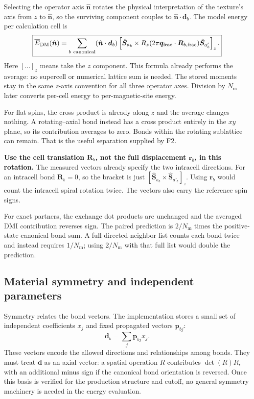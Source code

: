 \documentclass[11pt,a4paper]{article}
\numberwithin{equation}{section}
\newcommand{\vct}[1]{\bm{#1}}
\newcommand{\nh}{\hat{\vct n}}
\newcommand{\qh}{\vct q}
\newcommand{\Nm}{N_{\mathrm m}}
\begin{document}
Selecting the operator axis $\nh$ rotates the physical interpretation
of the texture's axis from $z$ to $\nh$, so the surviving component
couples to $\nh\cdot\vct d_b$. The model energy per calculation cell is
\begin{equation}\label{eq:ham}
 \boxed{\overline E_{\rm DM}(\nh)=
 \sum_{b\ {\rm canonical}}
 (\nh\cdot\vct d_b)
 \left[\hat{\vct S}_{a_b}\times
 R_z(2\pi\qh_{\rm frac}\cdot\vct R_{b,\rm frac})
 \hat{\vct S}_{a'_b}\right]_z.}
\end{equation}
Here $[\ldots]_z$ means take the $z$ component. This formula already
performs the average: no supercell or numerical lattice sum is needed.
The stored moments stay in the same $z$-axis convention for all three
operator axes. Division by $\Nm$ later converts per-cell energy to
per-magnetic-site energy.

For flat spins, the cross product is already along $z$ and the average
changes nothing. A rotating--axial bond instead has a cross product
entirely in the $xy$ plane, so its contribution averages to zero.
Bonds within the rotating sublattice can remain. That is the useful
separation supplied by F2.

\textbf{Use the cell translation $\vct R_b$, not the full displacement
$\vct r_b$, in this rotation.}
The measured vectors already specify the two intracell directions.
For an intracell bond $\vct R_b=0$, so the bracket is just
$[\hat{\vct S}_{a_b}\times\hat{\vct S}_{a'_b}]_z$.
Using $\vct r_b$ would count the intracell spiral rotation twice.
The vectors also carry the reference spin signs.


For exact partners, the exchange dot products are unchanged and the
averaged DMI contribution reverses sign. The paired prediction is
$2/\Nm$ times the positive-state canonical-bond sum. A full
directed-neighbor list counts each bond twice and instead requires
$1/\Nm$; using $2/\Nm$ with that full list would double the prediction.

\subsection{Material symmetry and independent parameters}

Symmetry relates the bond vectors. The implementation stores a small set
of independent coefficients $x_j$ and fixed propagated vectors
$\vct p_{bj}$:
\begin{equation}\label{eq:basis}
 \vct d_b=\sum_j\vct p_{bj}x_j.
\end{equation}
These vectors encode the allowed directions and relationships among bonds.
They must treat $\vct d$ as an axial vector: a spatial operation $R$
contributes $\det(R)R$, with an additional minus sign if the canonical
bond orientation is reversed. Once this basis is verified for the
production structure and cutoff, no general symmetry machinery is needed
in the energy evaluation.
\end{document}
